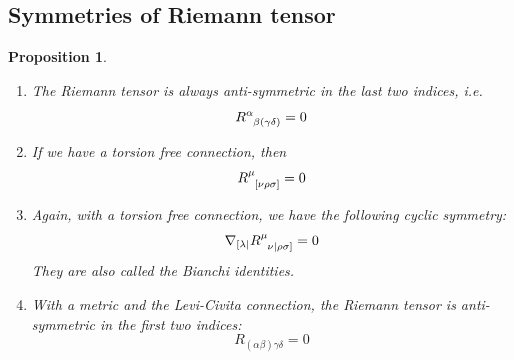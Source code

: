 \documentclass[a4paper]{article}
\theoremstyle{new}
\newtheorem{prop}{Proposition}[section]
\begin{document}
\subsection{Symmetries of Riemann tensor}
\begin{prop}\leavevmode
\begin{enumerate}
    \item The Riemann tensor is always anti-symmetric in the last two indices, i.e.
    \begin{equation}
    \tensor*{R}{*_{}^{\alpha}_{\beta(\gamma\delta)}}=0\label{symmetry1}
    \end{equation}
    \item If we have a torsion free connection, then
    \begin{equation}
   \tensor*{R}{*_{}^{\mu}_{[\nu\rho\sigma]}}=0\label{symmetry2}
   \end{equation}
   \item Again, with a torsion free connection, we have the following cyclic symmetry:
   \begin{equation}
   \nabla_{[\lambda|}\tensor*{R}{*_{}^{\mu}_{\nu|\rho\sigma]}}=0\label{symmetry3}
   \end{equation}
They are also called the Bianchi identities.
   \item With a metric and the Levi-Civita connection, the Riemann tensor is anti-symmetric in the first two indices:
   \begin{equation}
   R_{(\alpha\beta)\gamma\delta}=0\label{symmetry4}
   \end{equation}
\end{enumerate}
\end{prop}
\end{document}
